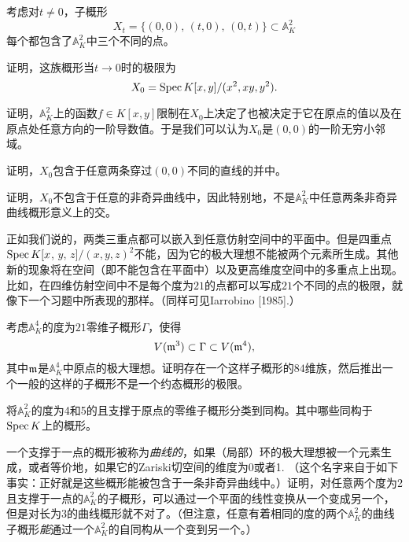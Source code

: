 \begin{exe}
	考虑对$t\neq 0$，子概形
	\[
	X_t=\{(0,0)\text{, }(t,0)\text{, }(0,t)\}\subset \mathbb{A}_K^2
	\]
	每个都包含了$\mathbb{A}_{K}^2$中三个不同的点。

	\begin{compactenum}[(a)]
		\item 证明，这族概形当$t\to 0$时的极限为
		\[
		X_0=\operatorname{Spec} K[x,y]/(x^2,xy,y^2).
		\]
		\item 证明，$\mathbb{A}_K^2$上的函数$f\in K[x,y]$限制在$X_0$上决定了也被决定于它在原点的值以及在原点处任意方向的一阶导数值。于是我们可以认为$X_0$是$(0,0)$的一阶无穷小邻域。
		\item 证明，$X_0$包含于任意两条穿过$(0,0)$不同的直线的并中。
		\item 证明，$X_0$不包含于任意的非奇异曲线中，因此特别地，不是$\mathbb{A}_K^2$中任意两条非奇异曲线概形意义上的交。
	\end{compactenum}
\end{exe}

正如我们说的，两类三重点都可以嵌入到任意仿射空间中的平面中。但是四重点$\operatorname{Spec} K[x$, $y$, $z]/(x,y,z)^2$不能，因为它的极大理想不能被两个元素所生成。其他新的现象将在空间（即不能包含在平面中）以及更高维度空间中的多重点上出现。比如，在四维仿射空间中不是每个度为$21$的点都可以写成$21$个不同的点的极限，就像下一个习题中所表现的那样。（同样可见Iarrobino [1985].）

\begin{exe}
	考虑$\mathbb{A}_K^4$的度为$21$零维子概形$\Gamma$，使得
	\[
	V(\mathfrak{m}^3)\subset \Gamma \subset V(\mathfrak{m}^4),
	\]
	其中$\mathfrak{m}$是$\mathbb{A}_K^4$中原点的极大理想。证明存在一个这样子概形的$84$维族，然后推出一个一般的这样的子概形不是一个约态概形的极限。
\end{exe}

\begin{exe}
	将$\mathbb{A}_K^2$的度为4和5的且支撑于原点的零维子概形分类到同构。其中哪些同构于$\operatorname{Spec} K$上的概形。
\end{exe}

\begin{exe}
	一个支撑于一点的概形被称为\textit{曲线的}，如果（局部）环的极大理想被一个元素生成，或者等价地，如果它的Zariski切空间的维度为0或者1. （这个名字来自于如下事实：正好就是这些概形能被包含于一条非奇异曲线中。）证明，对任意两个度为2且支撑于一点的$\mathbb{A}_K^2$的子概形，可以通过一个平面的线性变换从一个变成另一个，但是对长为3的曲线概形就不对了。（但注意，任意有着相同的度的两个$\mathbb{A}_K^2$的曲线子概形\textit{能}通过一个$\mathbb{A}_K^2$的自同构从一个变到另一个。）
\end{exe}

